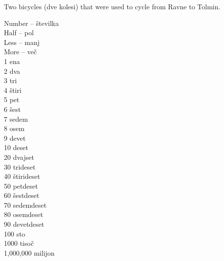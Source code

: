 \begin{marginfigure}
\checkoddpage \ifoddpage \forcerectofloat \else \forceversofloat \fi
\centering
 \caption{Two bicycles (dve kolesi) that were used to cycle from Ravne to Tolmin. }
 \label{kolo}
\end{marginfigure}

Number -- številka\\
Half --  pol\\
Less -- manj\\
More -- več\\
1 ena\\
2 dva\\
3 tri\\
4 štiri\\
5 pet\\
6 šest\\
7 sedem\\
8 osem\\
9 devet\\
10 deset\\
20 dvajset\\
30 trideset\\
40 štirideset\\
50 petdeset\\
60 šestdeset\\
70 sedemdeset\\
80 osemdeset\\
90 devetdeset\\
100 sto\\
1000 tisoč\\
1,000,000 milijon\\

